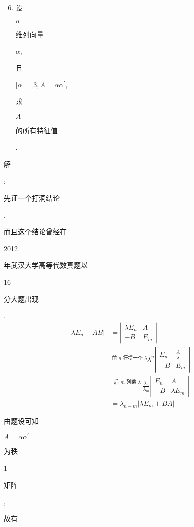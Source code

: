 \documentclass[10pt]{article}
\begin{document}
\begin{enumerate}
  \setcounter{enumi}{5}
  \item \begin{CJK}{UTF8}{mj}设\end{CJK} $n$ \begin{CJK}{UTF8}{mj}维列向量\end{CJK} $\alpha$, \begin{CJK}{UTF8}{mj}且\end{CJK} $|\alpha|=3, A=\alpha \alpha^{\prime}$, \begin{CJK}{UTF8}{mj}求\end{CJK} $A$ \begin{CJK}{UTF8}{mj}的所有特征值\end{CJK}.
\end{enumerate}
\begin{CJK}{UTF8}{mj}解\end{CJK}: \begin{CJK}{UTF8}{mj}先证一个打洞结论\end{CJK}, \begin{CJK}{UTF8}{mj}而且这个结论曾经在\end{CJK} 2012 \begin{CJK}{UTF8}{mj}年武汉大学高等代数真题以\end{CJK} 16 \begin{CJK}{UTF8}{mj}分大题出现\end{CJK}.
$$
\begin{aligned}
\left|\lambda E_{n}+A B\right| &=\left|\begin{array}{cc}
\lambda E_{n} & A \\
-B & E_{m}
\end{array}\right| \\
& \stackrel{\text { 前 } n \text { 行提一个 } \lambda}{ } \lambda^{n}\left|\begin{array}{cc}
E_{n} & \frac{A}{\lambda} \\
-B & E_{m}
\end{array}\right| \\
& \stackrel{\text { 后 } m \text { 列乘 } \lambda}{=} \frac{\lambda_{n}}{\lambda_{m}}\left|\begin{array}{cc}
E_{n} & A \\
-B & \lambda E_{m}
\end{array}\right| \\
&=\lambda_{n-m}\left|\lambda E_{m}+B A\right|
\end{aligned}
$$
\begin{CJK}{UTF8}{mj}由题设可知\end{CJK} $A=\alpha \alpha^{\prime}$ \begin{CJK}{UTF8}{mj}为秩\end{CJK} 1 \begin{CJK}{UTF8}{mj}矩阵\end{CJK}, \begin{CJK}{UTF8}{mj}故有\end{CJK}
\end{document}

